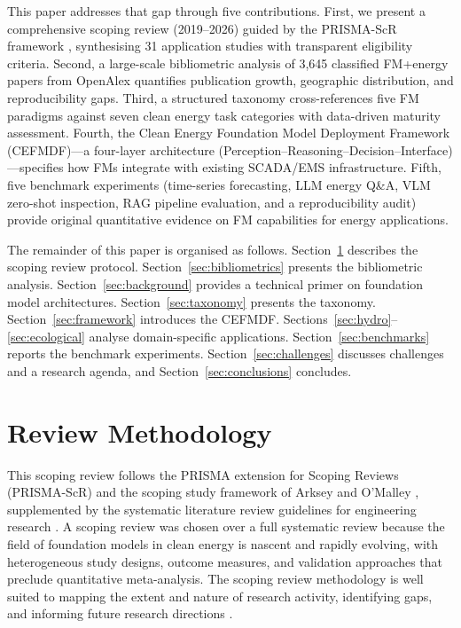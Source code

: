 \documentclass[preprint,12pt]{elsarticle}
\begin{document}
This paper addresses that gap through five contributions. First, we present a comprehensive scoping review (2019--2026) guided by the PRISMA-ScR framework \cite{tricco2018prisma_scr, page2021prisma}, synthesising 31 application studies with transparent eligibility criteria. Second, a large-scale bibliometric analysis of 3{,}645 classified FM+energy papers from OpenAlex quantifies publication growth, geographic distribution, and reproducibility gaps. Third, a structured taxonomy cross-references five FM paradigms against seven clean energy task categories with data-driven maturity assessment. Fourth, the Clean Energy Foundation Model Deployment Framework (CEFMDF)---a four-layer architecture (Perception--Reasoning--Decision--Interface)---specifies how FMs integrate with existing SCADA/EMS infrastructure. Fifth, five benchmark experiments (time-series forecasting, LLM energy Q\&A, VLM zero-shot inspection, RAG pipeline evaluation, and a reproducibility audit) provide original quantitative evidence on FM capabilities for energy applications.

The remainder of this paper is organised as follows. Section~\ref{sec:methodology} describes the scoping review protocol. Section~\ref{sec:bibliometrics} presents the bibliometric analysis. Section~\ref{sec:background} provides a technical primer on foundation model architectures. Section~\ref{sec:taxonomy} presents the taxonomy. Section~\ref{sec:framework} introduces the CEFMDF. Sections~\ref{sec:hydro}--\ref{sec:ecological} analyse domain-specific applications. Section~\ref{sec:benchmarks} reports the benchmark experiments. Section~\ref{sec:challenges} discusses challenges and a research agenda, and Section~\ref{sec:conclusions} concludes.

\section{Review Methodology}
\label{sec:methodology}

This scoping review follows the PRISMA extension for Scoping Reviews (PRISMA-ScR) \cite{tricco2018prisma_scr} and the scoping study framework of Arksey and O'Malley \cite{arksey2005scoping}, supplemented by the systematic literature review guidelines for engineering research \cite{kitchenham2007guidelines}. A scoping review was chosen over a full systematic review because the field of foundation models in clean energy is nascent and rapidly evolving, with heterogeneous study designs, outcome measures, and validation approaches that preclude quantitative meta-analysis. The scoping review methodology is well suited to mapping the extent and nature of research activity, identifying gaps, and informing future research directions \cite{page2021prisma}.
\end{document}
